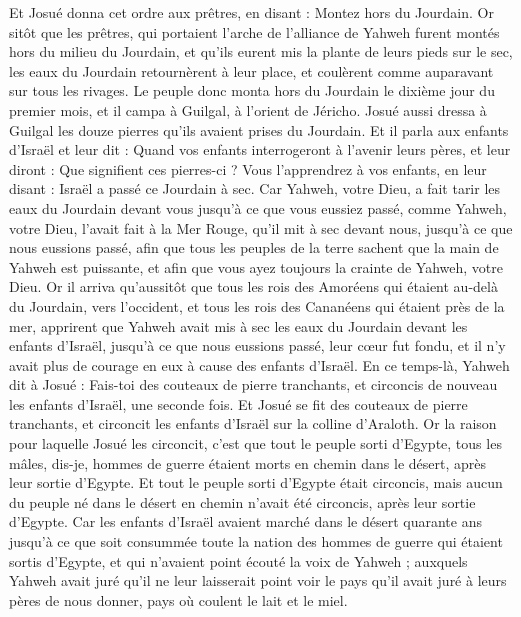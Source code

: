 \begin{multicols}{2}
Et Josué donna cet ordre aux prêtres, en disant : Montez hors du Jourdain.
Or sitôt que les prêtres, qui portaient l'arche de l'alliance de Yahweh furent montés hors du milieu du Jourdain, et qu'ils eurent mis la plante de leurs pieds sur le sec, les eaux du Jourdain retournèrent à leur place, et coulèrent comme auparavant sur tous les rivages.
Le peuple donc monta hors du Jourdain le dixième jour du premier mois, et il campa à Guilgal, à l'orient de Jéricho.
Josué aussi dressa à Guilgal les douze pierres qu'ils avaient prises du Jourdain.
Et il parla aux enfants d'Israël et leur dit : Quand vos enfants interrogeront à l'avenir leurs pères, et leur diront : Que signifient ces pierres-ci ?
Vous l'apprendrez à vos enfants, en leur disant : Israël a passé ce Jourdain à sec.
Car Yahweh, votre Dieu, a fait tarir les eaux du Jourdain devant vous jusqu'à ce que vous eussiez passé, comme Yahweh, votre Dieu, l'avait fait à la Mer Rouge, qu'il mit à sec devant nous, jusqu'à ce que nous eussions passé,
afin que tous les peuples de la terre sachent que la main de Yahweh est puissante, et afin que vous ayez toujours la crainte de Yahweh, votre Dieu.
\VerseOne{}Or il arriva qu'aussitôt que tous les rois des Amoréens qui étaient au-delà du Jourdain, vers l'occident, et tous les rois des Cananéens qui étaient près de la mer, apprirent que Yahweh avait mis à sec les eaux du Jourdain devant les enfants d'Israël, jusqu'à ce que nous eussions passé, leur cœur fut fondu, et il n'y avait plus de courage en eux à cause des enfants d'Israël.
En ce temps-là, Yahweh dit à Josué : Fais-toi des couteaux de pierre tranchants, et circoncis de nouveau les enfants d'Israël, une seconde fois.
Et Josué se fit des couteaux de pierre tranchants, et circoncit les enfants d'Israël sur la colline d'Araloth.
Or la raison pour laquelle Josué les circoncit, c'est que tout le peuple sorti d'Egypte, tous les mâles, dis-je, hommes de guerre étaient morts en chemin dans le désert, après leur sortie d'Egypte.
Et tout le peuple sorti d'Egypte était circoncis, mais aucun du peuple né dans le désert en chemin n'avait été circoncis, après leur sortie d'Egypte.
Car les enfants d'Israël avaient marché dans le désert quarante ans jusqu'à ce que soit consummée toute la nation des hommes de guerre qui étaient sortis d'Egypte, et qui n'avaient point écouté la voix de Yahweh ; auxquels Yahweh avait juré qu'il ne leur laisserait point voir le pays qu'il avait juré à leurs pères de nous donner, pays où coulent le lait et le miel.

\end{multicols}
